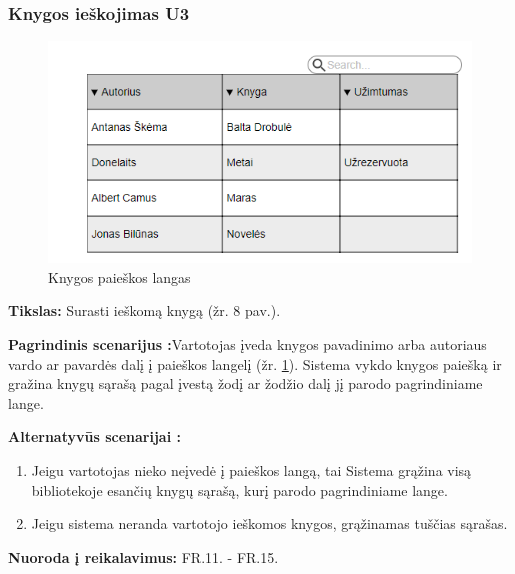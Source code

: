 \documentclass{VUMIFPSkursinis}
\begin{document}
 \subsubsection{Knygos ieškojimas U3}


\begin{figure}[H]
\label{fig:knylang}
    \centering
    \includegraphics[width=1\textwidth]{vidines/ucpaieska}
	\caption{Knygos paieškos langas}
\end{figure}

	\textbf{Tikslas:} Surasti ieškomą knygą (žr. 8 pav.).

	\textbf{Pagrindinis scenarijus :}Vartotojas įveda knygos pavadinimo arba autoriaus vardo ar pavardės dalį į paieškos langelį (žr. \ref{fig:knylang}). Sistema vykdo knygos paiešką ir gražina knygų sąrašą pagal įvestą žodį ar žodžio dalį jį parodo pagrindiniame lange.

	\textbf{Alternatyvūs scenarijai :}
    \begin{enumerate}
    \item Jeigu vartotojas nieko neįvedė į paieškos langą, tai Sistema grąžina visą bibliotekoje esančių knygų 		     sąrašą, kurį parodo pagrindiniame lange.
    \item Jeigu sistema neranda vartotojo ieškomos knygos, grąžinamas tuščias sąrašas.
    \end{enumerate}


	\textbf{Nuoroda į reikalavimus:} FR.11. - FR.15.
    
\end{document}
